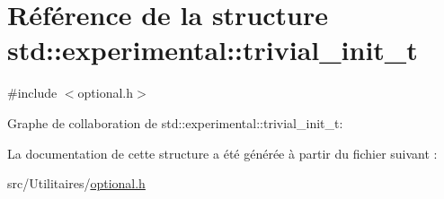 \hypertarget{structstd_1_1experimental_1_1trivial__init__t}{}\section{Référence de la structure std\+:\+:experimental\+:\+:trivial\+\_\+init\+\_\+t}
\label{structstd_1_1experimental_1_1trivial__init__t}


{\ttfamily \#include $<$optional.\+h$>$}



Graphe de collaboration de std\+:\+:experimental\+:\+:trivial\+\_\+init\+\_\+t\+:


La documentation de cette structure a été générée à partir du fichier suivant \+:\begin{DoxyCompactItemize}
\item 
src/\+Utilitaires/\hyperlink{optional_8h}{optional.\+h}\end{DoxyCompactItemize}
